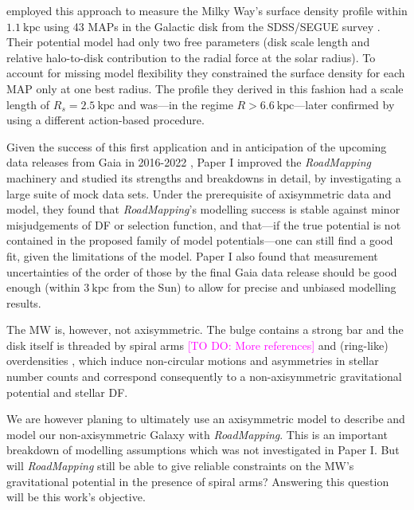 \documentclass[iop,revtex4,numberedappendix,appendixfloats]{emulateapj}
\newcommand{\RM}{{\sl RoadMapping}}
\newcommand{\Wilma}[1]{\textcolor{Magenta}{#1}}
\begin{document}
\citet{2013ApJ...779..115B} employed this approach to measure the Milky Way's surface density profile within $1.1~\text{kpc}$ using 43 MAPs in the Galactic disk from the SDSS/SEGUE survey \citep{2009AJ....137.4377Y}. Their potential model had only two free parameters (disk scale length and relative halo-to-disk contribution to the radial force at the solar radius). To account for missing model flexibility they constrained the surface density for each MAP only at one best radius. The profile they derived in this fashion had a scale length of $R_s=2.5~\text{kpc}$ and was---in the regime $R>6.6~\text{kpc}$---later confirmed by \citet{2014MNRAS.445.3133P} using a different action-based procedure.

Given the success of this first application and in anticipation of the upcoming data releases from Gaia in 2016-2022 \citep{2013CEAB...37..115E}, Paper I improved the \RM{} machinery and studied its strengths and breakdowns in detail, by investigating a large suite of mock data sets. Under the prerequisite of axisymmetric data and model, they found that \RM{}'s modelling success is stable against minor misjudgements of DF or selection function, and that---if the true potential is not contained in the proposed family of model potentials---one can still find a good fit, given the limitations of the model. Paper I also found that measurement uncertainties of the order of those by the final Gaia data release should be good enough (within $3~\text{kpc}$ from the Sun) to allow for precise and unbiased modelling results. 

The MW is, however, not axisymmetric. The bulge contains a strong bar \citep{1980ApJ...236..779L,1991ApJ...379..631B,2000MNRAS.317L..45H,2013MNRAS.435.1874W} and the disk itself is threaded by spiral arms \citep{2009PASP..121..213C,2014ApJ...783..130R} \Wilma{[TO DO: More references]} and (ring-like) overdensities \citep{2002ApJ...569..245N,2008ApJ...673..864J,2015ApJ...801..105X}, which induce non-circular motions and asymmetries in stellar number counts and correspond consequently to a non-axisymmetric gravitational potential and stellar DF.

We are however planing to ultimately use an axisymmetric model to describe and model our non-axisymmetric Galaxy with \RM{}. This is an important breakdown of modelling assumptions which was not investigated in Paper I. But will \RM{} still be able to give reliable constraints on the MW's gravitational potential in the presence of spiral arms? Answering this question will be this work's objective.
\end{document}
